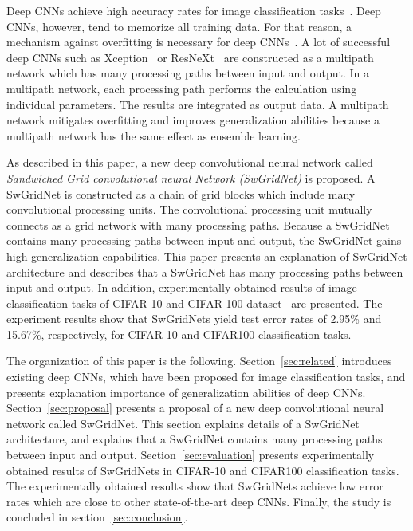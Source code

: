 \documentclass[10pt,twocolumn,letterpaper]{article}
\begin{document}
Deep CNNs achieve high accuracy rates for image classification tasks~\cite{ResNet,WideResNet,Xception,PyramidalResNet,ResNeXt}.
Deep CNNs, however, tend to memorize all training data. For that reason, a mechanism against overfitting is necessary for deep CNNs~\cite{UnderstandingDeepLearning}.
A lot of successful deep CNNs such as Xception~\cite{Xception} or ResNeXt~\cite{ResNeXt} are constructed as a multipath network
which has many processing paths between input and output.
In a multipath network, each processing path performs the calculation using individual parameters.
The results are integrated as output data.
A multipath network mitigates overfitting and improves generalization abilities
because a multipath network has the same effect as ensemble learning.

As described in this paper, a new deep convolutional neural network called {\it Sandwiched Grid convolutional neural Network (SwGridNet)} is proposed.
A SwGridNet is constructed as a chain of grid blocks which include many convolutional processing units.
The convolutional processing unit mutually connects as a grid network with many processing paths.
Because a SwGridNet contains many processing paths between input and output,
the SwGridNet gains high generalization capabilities.
This paper presents an explanation of SwGridNet architecture
and describes that a SwGridNet has many processing paths between input and output.
In addition, experimentally obtained results of image classification tasks of CIFAR-10 and CIFAR-100 dataset~\cite{CIFAR} are presented.
The experiment results show that SwGridNets yield test error rates of 2.95\% and 15.67\%, respectively, for CIFAR-10 and CIFAR100 classification tasks.

The organization of this paper is the following.
Section~\ref{sec:related} introduces existing deep CNNs, which have been proposed for image classification tasks, and presents explanation importance of generalization abilities of deep CNNs.
Section~\ref{sec:proposal} presents a proposal of a new deep convolutional neural network called SwGridNet.
This section explains details of a SwGridNet architecture,
and explains that a SwGridNet contains many processing paths between input and output.
Section~\ref{sec:evaluation} presents experimentally obtained results of SwGridNets in CIFAR-10 and CIFAR100 classification tasks.
The experimentally obtained results show that SwGridNets achieve low error rates which are close to other state-of-the-art deep CNNs.
Finally, the study is concluded in section~\ref{sec:conclusion}.
\end{document}
